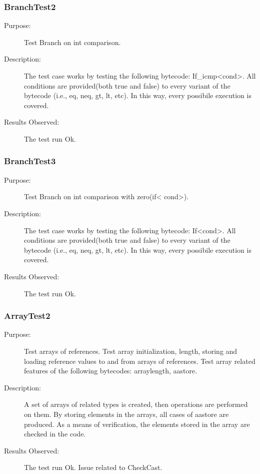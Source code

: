 \subsubsection{BranchTest2}
\begin{description}
   \item[Purpose:]
Test Branch on int comparison.
   \item[Description:]
The test case works by testing the following bytecode: \newline
If\_icmp\textless cond\textgreater. All conditions are provided(both
true and false) to every variant of the bytecode (i.e., eq, neq, gt,
lt, etc). In this way, every possibile execution is covered.
  \item[Results Observed:]
The test run Ok.
\end{description}


\subsubsection{BranchTest3}
\begin{description}
   \item[Purpose:]
Test Branch on int comparison with zero(if\textless
cond\textgreater).
   \item[Description:]
The test case works by testing the following bytecode: \newline
If\textless cond\textgreater. All conditions are provided(both true
and false) to every variant of the bytecode (i.e., eq, neq, gt, lt,
etc). In this way, every possibile execution is covered.
  \item[Results Observed:]
The test run Ok.
\end{description}




\subsubsection{ArrayTest2}
\begin{description}
   \item[Purpose:]
Test arrays of references. Test array initialization, length,
storing and loading reference values to and from arrays of
references. Test array related features of the following bytecodes:
arraylength, aastore.
   \item[Description:]
A set of arrays of related types is created, then operations are
performed on them. By storing elements in the arrays, all cases of
aastore are produced. As a means of verification, the elements
stored in the array are checked in the code.

   \item[Results Observed:]
The test run Ok. Issue related to CheckCast.
\end{description}

